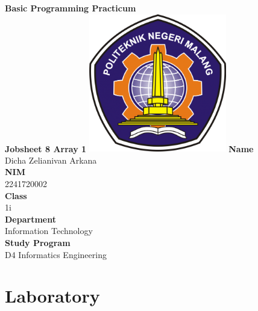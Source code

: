 \documentclass[12pt,titlepage]{article}
\newcommand{\vSubject}{Basic Programming Practicum}
\newcommand{\vSubtitle}{Jobsheet 8 Array 1}
\newcommand{\vName}{Dicha Zelianivan Arkana}
\newcommand{\vNIM}{2241720002}
\newcommand{\vClass}{1i}
\newcommand{\vDepartment}{Information Technology}
\newcommand{\vStudyProgram}{D4 Informatics Engineering}
\begin{document}
\begin{titlepage}
    \centering
    \vfill
    {\bfseries\LARGE
        \vSubject\\
        \vskip0.25cm
        \vSubtitle
    }
    \vfill
    \includegraphics[width=6cm]{images/polinema-logo.png}
    \vfill
    {
        \textbf{Name}\\
        \vName\\
        \vskip0.5cm
        \textbf{NIM}\\
        \vNIM\\
        \vskip0.5cm
        \textbf{Class}\\
        \vClass\\
        \vskip0.5cm
        \textbf{Department}\\
        \vDepartment\\
        \vskip0.5cm
        \textbf{Study Program}\\
        \vStudyProgram
    }
\end{titlepage}

\section{Laboratory}
\end{document}

